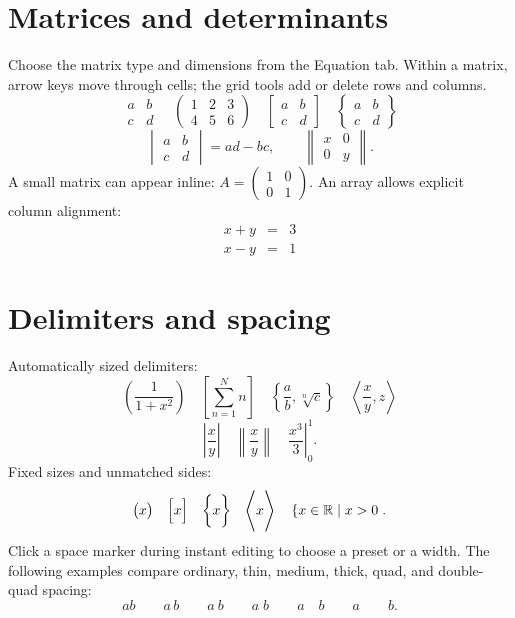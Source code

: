 \documentclass[12pt]{article}
\newcommand{\R}{\mathbb{R}}
\begin{document}
\section{Matrices and determinants}
Choose the matrix type and dimensions from the Equation tab. Within a matrix,
arrow keys move through cells; the grid tools add or delete rows and columns.
\[
 \begin{matrix}a&b\\c&d\end{matrix}\quad
 \begin{pmatrix}1&2&3\\4&5&6\end{pmatrix}\quad
 \begin{bmatrix}a&b\\c&d\end{bmatrix}\quad
 \begin{Bmatrix}a&b\\c&d\end{Bmatrix}
\]
\[
 \begin{vmatrix}a&b\\c&d\end{vmatrix}=ad-bc,\qquad
 \begin{Vmatrix}x&0\\0&y\end{Vmatrix}.
\]
A small matrix can appear inline:
$A=\left(\begin{smallmatrix}1&0\\0&1\end{smallmatrix}\right)$.
An array allows explicit column alignment:
\[
 \begin{array}{rcl}
  x+y&=&3\\
  x-y&=&1
 \end{array}
\]

\section{Delimiters and spacing}
Automatically sized delimiters:
\[
 \left(\frac{1}{1+x^2}\right)\quad
 \left[\sum_{n=1}^N n\right]\quad
 \left\{\frac{a}{b},\sqrt[n]{c}\right\}\quad
 \left\langle\frac{x}{y},z\right\rangle
\]
\[
 \left\lvert\frac{x}{y}\right\rvert\quad
 \left\lVert\frac{x}{y}\right\rVert\quad
 \left.\frac{x^3}{3}\right|_0^1.
\]
Fixed sizes and unmatched sides:
\[
 \bigl(x\bigr)\quad \Bigl[x\Bigr]\quad \biggl\{x\biggr\}\quad
 \Biggl\langle x\Biggr\rangle\quad
 \left\{x\in\R\mid x>0\right..
\]
Click a space marker during instant editing to choose a preset or a width.
The following examples compare ordinary, thin, medium, thick, quad, and
double-quad spacing:
\[
 ab\qquad a\,b\qquad a\:b\qquad a\;b\qquad
 a\quad b\qquad a\qquad b.
\]
\end{document}
